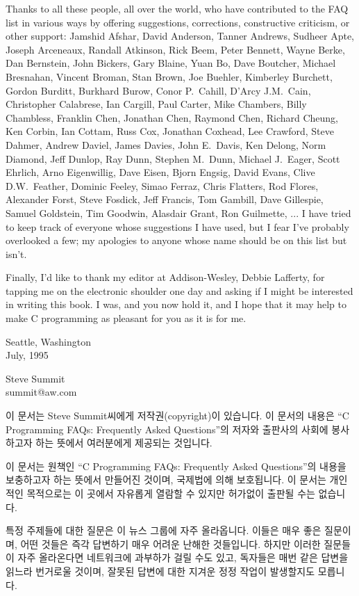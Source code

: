 Thanks to all these people, all over the world, who have contributed to the
FAQ list in various ways by offering suggestions, corrections, constructive
criticism, or other support: Jamshid Afshar, David Anderson, Tanner Andrews,
Sudheer Apte, Joseph Arceneaux, Randall Atkinson, Rick Beem, Peter Bennett,
Wayne Berke, Dan Bernstein, John Bickers, Gary Blaine, Yuan Bo, Dave Boutcher,
Michael Bresnahan, Vincent Broman, Stan Brown, Joe Buehler, Kimberley Burchett,
Gordon Burditt, Burkhard Burow, Conor P.\ Cahill, D'Arcy J.M.\ Cain,
Christopher Calabrese, Ian Cargill, Paul Carter, Mike Chambers, Billy Chambless,
Franklin Chen, Jonathan Chen, Raymond Chen, Richard Cheung, Ken Corbin, 
Ian Cottam, Russ Cox, Jonathan Coxhead, Lee Crawford, Steve Dahmer, Andrew
Daviel, James Davies, John E.\ Davis, Ken Delong, Norm Diamond, Jeff Dunlop,
Ray Dunn, Stephen M.\ Dunn, Michael J.\ Eager, Scott Ehrlich, Arno Eigenwillig,
Dave Eisen, Bjorn Engsig, David Evans, Clive D.W.\ Feather, Dominic Feeley,
Simao Ferraz, Chris Flatters, Rod Flores, Alexander Forst, Steve Fosdick,
Jeff Francis, Tom Gambill, Dave Gillespie, Samuel Goldstein, Tim Goodwin,
Alasdair Grant, Ron Guilmette, ...
I have tried to keep track of everyone whose suggestions I have used, but I
fear I've probably overlooked a few; my apologies to anyone whose name should
be on this list but isn't.

Finally, I'd like to thank my editor at Addison-Wesley, Debbie Lafferty, for
tapping me on the electronic shoulder one day and asking if I might be
interested in writing this book.  I was, and you now hold it, and I hope that
it may help to make C programming as pleasant for you as it is for me.

Seattle, Washington \\
\noindent July, 1995

Steve Summit \\
\noindent summit@aw.com


이 문서는 Steve Summit씨에게 저작권(copyright)이 있습니다.
이 문서의 내용은 ``C Programming FAQs: Frequently Asked Questions''의
저자와 출판사의 사회에 봉사하고자 하는 뜻에서 여러분에게 제공되는 것입니다.

이 문서는 원책인 ``C Programming FAQs: Frequently Asked Questions''의 내용을
보충하고자 하는 뜻에서 만들어진 것이며,
국제법에 의해 보호됩니다.  이 문서는 개인적인 목적으로는 이 곳에서
자유롭게 열람할 수 있지만 허가없이 출판될 수는 없습니다.

특정 주제들에 대한 질문은 이 뉴스 그룹에 자주 올라옵니다.
이들은 매우 좋은 질문이며, 어떤 것들은 즉각 답변하기 매우 어려운
난해한 것들입니다.  하지만 이러한 질문들이 자주 올라온다면
네트워크에 과부하가 걸릴 수도
있고, 독자들은 매번 같은 답변을 읽느라 번거로울 것이며,
잘못된 답변에 대한 지겨운 정정 작업이 발생할지도 모릅니다.

